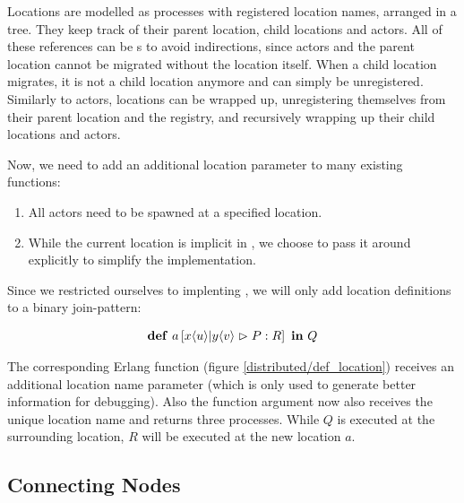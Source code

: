 Locations are modelled as processes with registered location names,
arranged in a tree.
They keep track of their parent location, child locations and actors.
All of these references can be \PID{}s to avoid indirections,
since actors and the parent location cannot be migrated without the location
itself.
When a child location migrates, it is not a child location anymore and can
simply be unregistered.
Similarly to actors, locations can be wrapped up,
unregistering themselves from their parent location and the registry,
and recursively wrapping up their child locations and actors.

Now, we need to add an additional location parameter to many existing functions:
\begin{enumerate}[nosep]
  \item
    All actors need to be spawned at a specified location.
  \item
    While the current location is implicit in \distjoincalc,
    we choose to pass it around explicitly to simplify the implementation.
\end{enumerate}

Since we restricted ourselves to implenting \corejoincalc,
we will only add location definitions to a binary join-pattern:

\begin{align*}
  \textbf{\textup{def}} \ a \left[ x\langle u\rangle | y\langle v\rangle \vartriangleright P : R \right] \ \textbf{\textup{in}} \ Q
\end{align*}

The corresponding Erlang function (figure \ref{distributed/def_location})
receives an additional location name parameter
(which is only used to generate better information for debugging).
Also the function argument now also receives the unique location name and
returns three processes.
While $Q$ is executed at the surrounding location,
$R$ will be executed at the new location $a$.






\subsection{Connecting Nodes}


